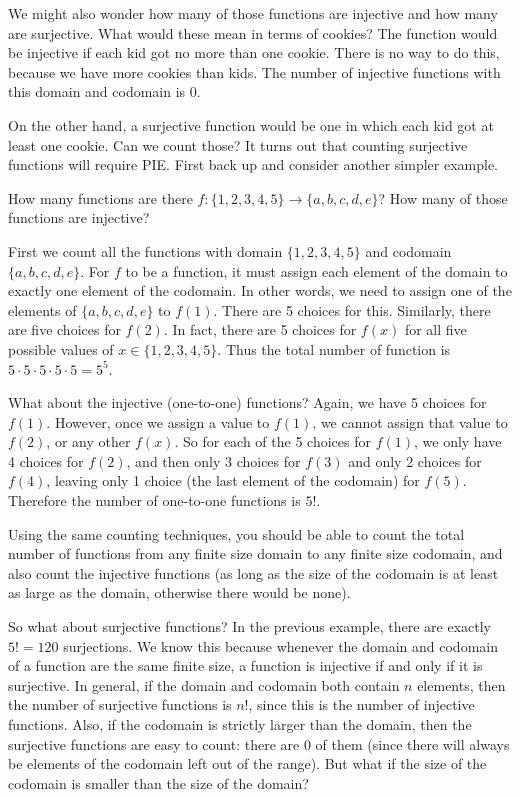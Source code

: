 \documentclass[12pt]{article}
\begin{document}
We might also wonder how many of those functions are injective and how many are surjective.  What would these mean in terms of cookies?  The function would be injective if each kid got no more than one cookie.  There is no way to do this, because we have more cookies than kids.  The number of injective functions with this domain and codomain is 0.  

On the other hand, a surjective function would be one in which each kid got at least one cookie.  Can we count those? It turns out that counting surjective functions will require PIE.  First back up and consider another simpler example.

\begin{example}
  How many functions are there $f: \{1,2,3,4,5\} \to \{a,b,c,d,e\}$?  How many of those functions are injective? 
  \begin{solution}
    First we count all the functions with domain $\{1,2,3,4,5\}$ and codomain $\{a,b,c,d,e\}$.  For $f$ to be a function, it must assign each element of the domain to exactly one element of the codomain.  In other words, we need to assign one of the elements of $\{a,b,c,d,e\}$ to $f(1)$.  There are 5 choices for this.  Similarly, there are five choices for $f(2)$.  In fact, there are 5 choices for $f(x)$ for all five possible values of $x \in \{1,2,3,4,5\}$.  Thus the total number of function is $5 \cdot 5 \cdot 5 \cdot 5 \cdot 5 = 5^5$.
    
    What about the injective (one-to-one) functions?  Again, we have 5 choices for $f(1)$.  However, once we assign a value to $f(1)$, we cannot assign that value to $f(2)$, or any other $f(x)$.  So for each of the 5 choices for $f(1)$, we only have 4 choices for $f(2)$, and then only 3 choices for $f(3)$ and only 2 choices for $f(4)$, leaving only 1 choice (the last element of the codomain) for $f(5)$.  Therefore the number of one-to-one functions is $5!$.
  \end{solution}

\end{example}


Using the same counting techniques, you should be able to count the total number of functions from any finite size domain to any finite size codomain, and also count the injective functions (as long as the size of the codomain is at least as large as the domain, otherwise there would be none).

So what about surjective functions?  In the previous example, there are exactly $5! = 120$ surjections.  We know this because whenever the domain and codomain of a function are the same finite size, a function is injective if and only if it is surjective.  In general, if the domain and codomain both contain $n$ elements, then the number of surjective functions is $n!$, since this is the number of injective functions.  Also, if the codomain is strictly larger than the domain, then the surjective functions are easy to count: there are 0 of them (since there will always be elements of the codomain left out of the range).  But what if the size of the codomain is smaller than the size of the domain?
\end{document}
